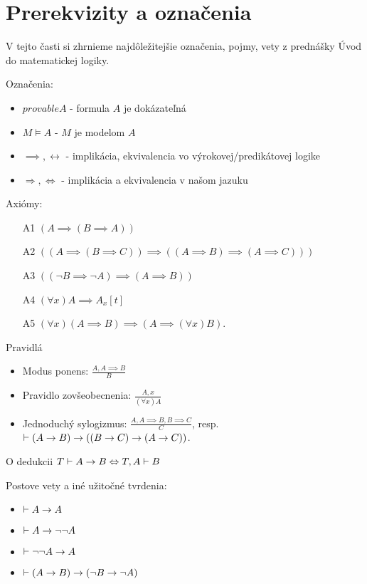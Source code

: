 \section{Prerekvizity a označenia}

V tejto časti si zhrnieme najdôležitejšie označenia, pojmy, vety z
prednášky Úvod do matematickej logiky.

Označenia:
\begin{itemize}
    \item $provable A$ - formula $A$ je dokázateľná
    \item $M \models A$ - $M$ je modelom $A$
    \item $\implies, \leftrightarrow$ - implikácia, ekvivalencia vo
    výrokovej/predikátovej logike
    \item $\Rightarrow, \Leftrightarrow$ - implikácia a ekvivalencia v
    našom jazuku
\end{itemize}

Axiómy:
\begin{itemize}
    \item[A1] $(A \implies (B \implies A))$
    \item[A2] $((A \implies (B \implies C)) \implies 
                ((A \implies B) \implies (A \implies C)))$
    \item[A3] $((\neg B \implies \neg A) \implies (A \implies B))$
    \vskip 0.5cm
    \item[A4] $(\forall x) A \implies A_x[t]$
    \item[A5] $(\forall x) (A \implies B) \implies (A \implies
    (\forall x) B)$.
\end{itemize}

Pravidlá
\begin{itemize}
    \item Modus ponens: $\displaystyle \frac{A,A\implies B}{B}$
    \item Pravidlo zovšeobecnenia:
            $\displaystyle \frac{A,x}{(\forall x)A}$
    \item Jednoduchý sylogizmus:
            $\displaystyle \frac{A, A\implies B, B\implies C}{C}$, resp.
            $\vdash (A \rightarrow B) \rightarrow ((B \rightarrow C) 
                \rightarrow (A \rightarrow C))$.
\end{itemize}

\begin{veta}{O dedukcii}
    $T \vdash A \rightarrow B \Leftrightarrow T,A \vdash B$
\end{veta}

Postove vety a iné užitočné tvrdenia:
\begin{itemize}
    \item $\vdash A \rightarrow A$
    \item $\vdash A \rightarrow \neg \neg A$
    \item $\vdash \neg \neg A \rightarrow A$
    \item $\vdash (A \rightarrow B) \rightarrow (\neg B \rightarrow \neg A)$
\end{itemize}

